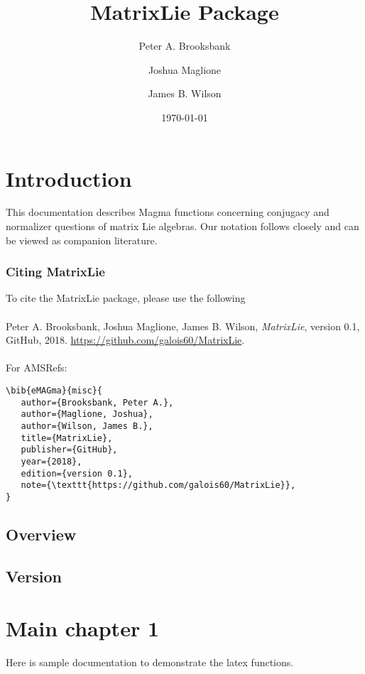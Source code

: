 \documentclass{documentation}
\title{MatrixLie Package}
\author{Peter A. Brooksbank}
\author{Joshua Maglione}
\author{James B. Wilson}
\date{\today}
\begin{document}
\frontmatter

\dominitoc
\maketitle
\tableofcontents

\mainmatter

\chapter{Introduction}

This documentation describes Magma functions concerning conjugacy and normalizer questions of matrix Lie algebras.
Our notation follows \cite{BMW:Main} closely and can be viewed as companion literature. 

\subsection*{Citing MatrixLie} 
To cite the MatrixLie package, please use the following\\
\\
Peter A. Brooksbank, Joshua Maglione, James B. Wilson, \emph{MatrixLie}, version 0.1, GitHub, 2018. \url{https://github.com/galois60/MatrixLie}. \\
\\
For AMSRefs:
\begin{verbatim}
\bib{eMAGma}{misc}{
   author={Brooksbank, Peter A.},
   author={Maglione, Joshua},
   author={Wilson, James B.},
   title={MatrixLie},
   publisher={GitHub},
   year={2018},
   edition={version 0.1},
   note={\texttt{https://github.com/galois60/MatrixLie}},
}
\end{verbatim}

\section{Overview}

\section{Version}




\chapter{Main chapter 1}


Here is sample documentation to demonstrate the latex functions.
\end{document}
